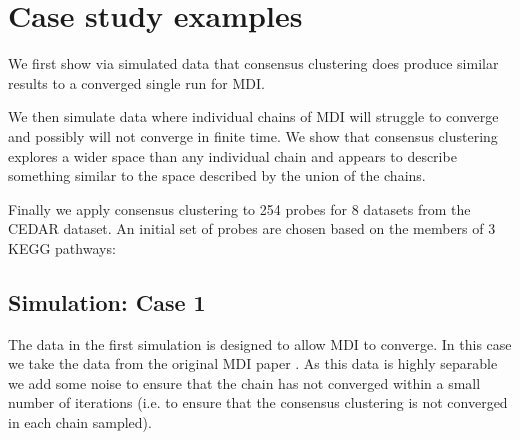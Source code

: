 \documentclass[12pt]{article} %
\begin{document}
	
	
	

	

	\section{Case study examples}
	We first show via simulated data that consensus clustering does produce similar results to a converged single run for MDI.
	
	We then simulate data where individual chains of MDI will struggle to converge and possibly will not converge in finite time. We show that consensus clustering explores a wider space than any individual chain and appears to describe something similar to the space described by the union of the chains.
	
	Finally we apply consensus clustering to 254 probes for 8 datasets from the CEDAR dataset. An initial set of probes are chosen based on the members of 3 KEGG pathways:
	
	\subsection{Simulation: Case 1} \label{sec:sim:data:case_1}
	The data in the first simulation is designed to allow MDI to converge. In this case we take the data from the original MDI paper \cite{KirkBayesiancorrelatedclustering2012}. As this data is highly separable we add some noise to ensure that the chain has not converged within a small number of iterations (i.e. to ensure that the consensus clustering is not converged in each chain sampled). 
	
\end{document}
